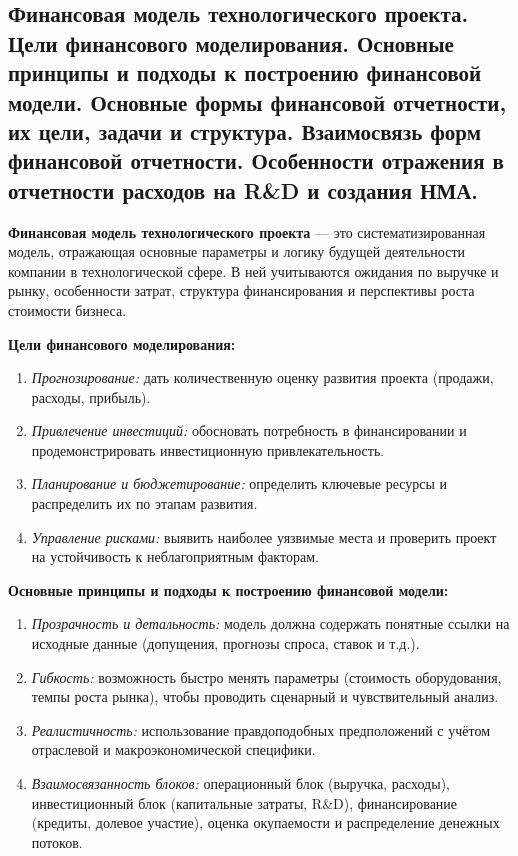 \pagebreak

\subsection{Финансовая модель технологического проекта. Цели финансового моделирования. Основные принципы и подходы к построению финансовой модели. Основные формы финансовой отчетности, их цели, задачи и структура. Взаимосвязь форм финансовой отчетности. Особенности отражения в отчетности расходов на R\&D и создания НМА.}

\textbf{Финансовая модель технологического проекта} --- это систематизированная модель, отражающая основные параметры и логику будущей деятельности компании в технологической сфере. В ней учитываются ожидания по выручке и рынку, особенности затрат, структура финансирования и перспективы роста стоимости бизнеса.

\textbf{Цели финансового моделирования:}
\begin{enumerate}
    \item \textit{Прогнозирование:} дать количественную оценку развития проекта (продажи, расходы, прибыль).
    \item \textit{Привлечение инвестиций:} обосновать потребность в финансировании и продемонстрировать инвестиционную привлекательность.
    \item \textit{Планирование и бюджетирование:} определить ключевые ресурсы и распределить их по этапам развития.
    \item \textit{Управление рисками:} выявить наиболее уязвимые места и проверить проект на устойчивость к неблагоприятным факторам.
\end{enumerate}

\textbf{Основные принципы и подходы к построению финансовой модели:}
\begin{enumerate}
    \item \textit{Прозрачность и детальность:} модель должна содержать понятные ссылки на исходные данные (допущения, прогнозы спроса, ставок и т.д.).
    \item \textit{Гибкость:} возможность быстро менять параметры (стоимость оборудования, темпы роста рынка), чтобы проводить сценарный и чувствительный анализ.
    \item \textit{Реалистичность:} использование правдоподобных предположений с учётом отраслевой и макроэкономической специфики.
    \item \textit{Взаимосвязанность блоков:} операционный блок (выручка, расходы), инвестиционный блок (капитальные затраты, R\&D), финансирование (кредиты, долевое участие), оценка окупаемости и распределение денежных потоков.
\end{enumerate}

